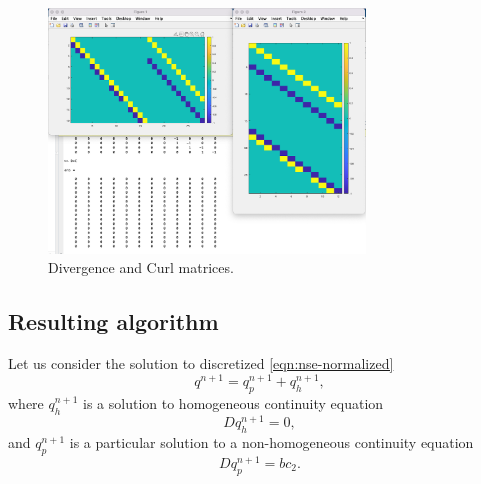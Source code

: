 \documentclass{article}
\begin{document}
\begin{figure}
\begin{center}
  \includegraphics[width=0.75\textwidth]{Figures/D-C-DC}
\end{center}
\caption{Divergence and Curl matrices.}
\label{fig:DC}
\end{figure}


\subsection{Resulting algorithm}\label{sec:algorithm}

Let us consider the solution to discretized \cref{eqn:nse-normalized}
\begin{equation*}
	q^{n+1}=q^{n+1}_p+q^{n+1}_h,
\end{equation*}
where $q^{n+1}_h$ is a solution to homogeneous continuity equation 
\begin{equation}\label{eqn:discrete-homogeneous-continuity}
	Dq^{n+1}_h=0,
\end{equation}
and $q^{n+1}_p$ is a particular solution to a non-homogeneous continuity equation
\begin{equation}\label{eqn:discrete-non-homogeneous-continuity}
	Dq^{n+1}_p=bc_2.
\end{equation}

\end{document}
